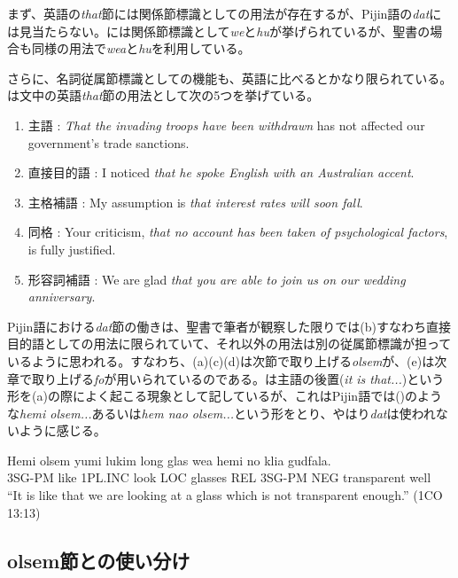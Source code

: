 まず、英語の\textit{that}節には関係節標識としての用法が存在する\cite[365-367]{english}が、Pijin語の\textit{dat}には見当たらない。\cite{dictionary}には関係節標識として\textit{we}と\textit{hu}が挙げられているが、聖書の場合も同様の用法で\textit{wea}と\textit{hu}を利用している。

さらに、名詞従属節標識としての機能も、英語に比べるとかなり限られている。\cite{english}は文中の英語\textit{that}節の用法として次の5つを挙げている。

\begin{enumerate}
  \item 主語 : \textit{That the invading troops have been withdrawn} has not affected our government's trade sanctions.
  \item 直接目的語 : I noticed \textit{that he spoke English with an Australian accent}.
  \item 主格補語 : My assumption is \textit{that interest rates will soon fall}.
  \item 同格 : Your criticism, \textit{that no account has been taken of psychological factors}, is fully justified.
  \item 形容詞補語 : We are glad \textit{that you are able to join us on our wedding anniversary}.
\end{enumerate}

Pijin語における\textit{dat}節の働きは、聖書で筆者が観察した限りでは(b)すなわち直接目的語としての用法に限られていて、それ以外の用法は別の従属節標識が担っているように思われる。すなわち、(a)(c)(d)は次節で取り上げる\textit{olsem}が、(e)は次章で取り上げる\textit{fo}が用いられているのである。\cite{english}は主語の後置(\textit{it is that...})という形を(a)の際によく起こる現象として記しているが、これはPijin語では()のような\textit{hemi olsem...}あるいは\textit{hem nao olsem...}という形をとり、やはり\textit{dat}は使われないように感じる。

\begin{exe}
  \ex
  \gll Hemi olsem yumi lukim long glas wea hemi no klia gudfala.\\
  3SG-PM like 1PL.INC look LOC glasses REL 3SG-PM NEG transparent well\\
  \glt ``It is like that we are looking at a glass which is not transparent enough.'' (1CO 13:13)
\end{exe}

\subsection{olsem節との使い分け}
